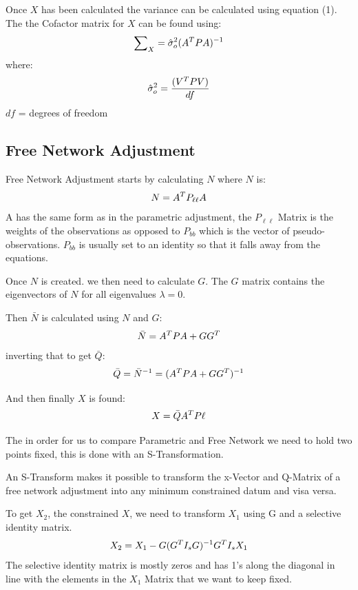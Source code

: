 \documentclass[11pt,a4paper]{article}
\begin{document}
		Once $X$ has been calculated the variance can be calculated using equation (1).
		The the Cofactor matrix for $X$ can be found using:
		\begin{equation}
		\notag
		\sum\nolimits_{X} = \hat{\sigma}_{o}^2(A^TPA)^{-1}
		\end{equation}
		where:
		\begin{equation}
		\notag
		\hat{\sigma}_{o}^2 = \frac{(V^TPV)}{df} 
		\end{equation}
		  $df$ = degrees of freedom
		
		
		\subsection{Free Network Adjustment}
		
		Free Network Adjustment starts by calculating $N$ where $N$ is:
		\begin{equation}
		\notag
		N = A^TP_{\ell\ell}A
		\end{equation}
		A has the same form as in the parametric adjustment, the $P_{\ell\ell}$ Matrix is the weights of the observations as opposed to $P_{bb}$ which is the vector of pseudo-observations. $P_{bb}$ is usually set to an identity so that it falls away from the equations.
		
		Once $N$ is created. we then need to calculate $G$. The $G$ matrix contains the eigenvectors of $N$ for all eigenvalues $\lambda = 0$.
		
		Then $\bar{N}$ is calculated using $N$ and $G$:
		\begin{equation}
		\notag
		\bar{N} = A^TPA + GG^T
		\end{equation}
		inverting that to get $\bar{Q}$:
		\begin{equation}
		\notag
		\bar{Q} = \bar{N}^{-1} = (A^TPA + GG^T)^{-1}
		\end{equation}
		
		And then finally $X$ is found:
		\begin{equation}
		\notag
		X = \bar{Q} A^TP\ell	
		\end{equation}
	
		The in order for us to compare Parametric and Free Network we need to hold two points fixed, this is done with an S-Transformation.
		
		An S-Transform makes it possible to transform the x-Vector and Q-Matrix of a free network adjustment into any minimum constrained datum and visa versa.
		
		To get $X_2$, the constrained $X$, we need to transform $X_1$ using G and a selective identity matrix.
		\begin{equation}
		\notag
		X_2 = X_1 - G(G^TI_sG)^{-1} G^T I_s X_1
		\end{equation}
		The selective identity matrix is mostly zeros and has 1's along the diagonal in line with the elements in the $X_1$ Matrix that we want to keep fixed.
		
\end{document}
